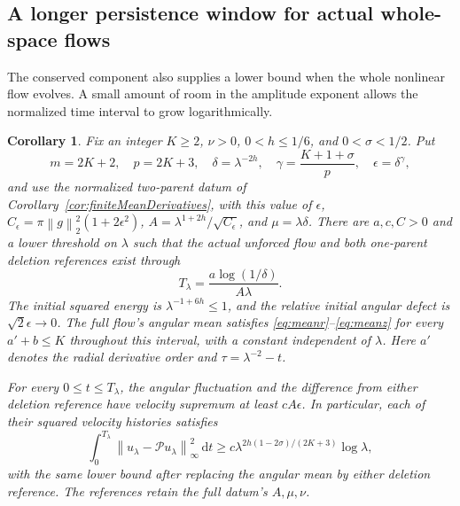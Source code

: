 \documentclass[11pt]{article}
\newtheorem{corollary}[theorem]{Corollary}
\theoremstyle{remark}
\newcommand{\PP}{\mathcal P}
\newcommand{\dd}{\,\mathrm d}
\newcommand{\norm}[1]{\left\lVert#1\right\rVert}
\begin{document}
\subsection{A longer persistence window for actual whole-space flows}

The conserved component also supplies a lower bound when the whole
nonlinear flow evolves. A small amount of room in the amplitude exponent
allows the normalized time interval to grow logarithmically.

\begin{corollary}\label{cor:nonlinearLogPersistence}
Fix an integer $K\geq2$, $\nu>0$, $0<h\leq1/6$, and
$0<\sigma<1/2$. Put
\[
 m=2K+2,\quad p=2K+3,\quad \delta=\lambda^{-2h},\quad
 \gamma=\frac{K+1+\sigma}{p},\quad \epsilon=\delta^\gamma,
\]
and use the normalized two-parent datum of
Corollary~\ref{cor:finiteMeanDerivatives}, with this value of
$\epsilon$, $C_\epsilon=\pi\norm g_2^2(1+2\epsilon^2)$,
$A=\lambda^{1+2h}/\sqrt{C_\epsilon}$, and $\mu=\lambda\delta$.
There are $a,c,C>0$ and a lower threshold on $\lambda$ such that the
actual unforced flow and both one-parent deletion references exist through
\[
 T_\lambda=\frac{a\log(1/\delta)}{A\lambda}.
\]
The initial squared energy is $\lambda^{-1+6h}\leq1$, and the
relative initial angular defect is $\sqrt2\epsilon\to0$.
The full flow's angular mean satisfies
\eqref{eq:meanr}--\eqref{eq:meanz} for every $a'+b\leq K$
throughout this interval, with a constant independent of $\lambda$.
Here $a'$ denotes the radial derivative order and
$\tau=\lambda^{-2}-t$.

For every $0\leq t\leq T_\lambda$, the angular fluctuation and the
difference from either deletion reference have velocity supremum at
least $cA\epsilon$. In particular, each of their squared velocity
histories satisfies
\begin{equation}\label{eq:nonlinearLogHistory}
 \int_0^{T_\lambda}\norm{u_\lambda-\PP u_\lambda}_\infty^2\dd t
   \geq c\lambda^{2h(1-2\sigma)/(2K+3)}\log\lambda,
\end{equation}
with the same lower bound after replacing the angular mean by either
deletion reference. The references retain the full datum's $A,\mu,\nu$.
\end{corollary}
\end{document}
